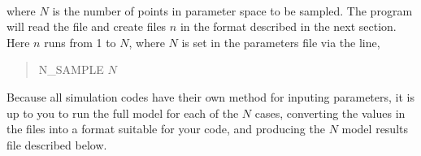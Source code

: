 \\
where $N$ is the number of points in parameter space to be sampled. The program will read the  file and create files $n$ in the format described in the next section. Here $n$ runs from 1 to $N$, where $N$ is set in the parameters file via the line,
\vspace*{-8pt}\begin{quote}
N\_SAMPLE $N$
\end{quote}\vspace*{-8pt}

Because all simulation codes have their own method for inputing parameters, it is up to you to run the full model for each of the $N$ cases, converting the values in the  files into a format suitable for your code, and producing the $N$ model results file described below. 
